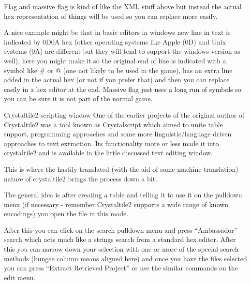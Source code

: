 \documentclass[
]{book}
\begin{document}
Flag and massive flag is kind of like the XML stuff above but instead the actual hex representation of things will be used so you can replace more easily.

A nice example might be that in basic editors in windows new line in text is indicated by 0D0A hex (other operating systems like Apple (0D) and Unix systems (0A) are different but they will tend to support the windows version as well), here you might make it so the original end of line is indicated with a symbol like \# or @ (one not likely to be used in the game), has an extra line added in the actual hex (or not if you prefer that) and then you can replace easily in a hex editor at the end. Massive flag just uses a long run of symbols so you can be sure it is not part of the normal game.

Crystaltile2 scripting window One of the earlier projects of the original author of Crystaltile2 was a tool known as Crystalscript which aimed to unite table support, programming approaches and some more linguistic/language driven approaches to text extraction. Its functionality more or less made it into crystaltile2 and is available in the little discussed text editing window.

This is where the hastily translated (with the aid of some machine translation) nature of crystaltile2 brings the process down a bit.

The general idea is after creating a table and telling it to use it on the pulldown menu (if necessary - remember Crystaltile2 supports a wide range of known encodings) you open the file in this mode.

After this you can click on the search pulldown menu and press ``Ambassador'' search which acts much like a strings search from a standard hex editor. After this you can narrow down your selection with one or more of the special search methods (bungee column means aligned here) and once you have the files selected you can press ``Extract Retrieved Project'' or use the similar commands on the edit menu.
\end{document}
